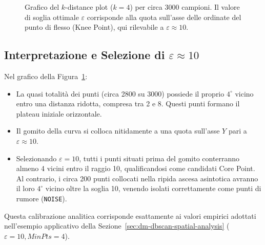 \begin{figure}[htbp]
\caption{Grafico del $k$-distance plot ($k = 4$) per circa 3000 campioni. Il valore di soglia ottimale $\varepsilon$ corrisponde alla quota sull'asse delle ordinate del punto di flesso (Knee Point), qui rilevabile a $\varepsilon \approx 10$.}
\label{fig:dm-dbscan-k-distance-plot}
\end{figure}

\subsection{Interpretazione e Selezione di \texorpdfstring{$\varepsilon \approx 10$}{Eps circa 10}}

Nel grafico della Figura~\ref{fig:dm-dbscan-k-distance-plot}:
\begin{itemize}
    \item La quasi totalità dei punti (circa 2800 su 3000) possiede il proprio $4^\circ$ vicino entro una distanza ridotta, compresa tra 2 e 8. Questi punti formano il plateau iniziale orizzontale.
    \item Il gomito della curva si colloca nitidamente a una quota sull'asse $Y$ pari a $\varepsilon \approx 10$.
    \item Selezionando $\varepsilon = 10$, tutti i punti situati prima del gomito conterranno almeno 4 vicini entro il raggio 10, qualificandosi come candidati Core Point. Al contrario, i circa 200 punti collocati nella ripida ascesa asintotica avranno il loro $4^\circ$ vicino oltre la soglia 10, venendo isolati correttamente come punti di rumore (\texttt{NOISE}).
\end{itemize}
Questa calibrazione analitica corrisponde esattamente ai valori empirici adottati nell'esempio applicativo della Sezione~\ref{sec:dm-dbscan-spatial-analysis} ($\varepsilon = 10, MinPts = 4$).


